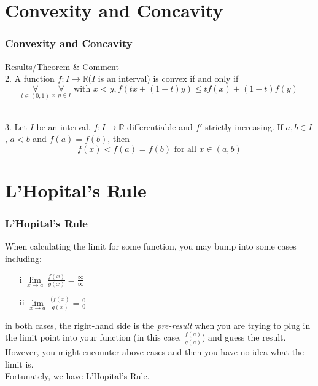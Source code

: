 \documentclass[12pt, t]{beamer}
\renewcommand{\emph}[1]{{\color{Turquoise3}\textsl{#1}}}
\begin{document}
\section{Convexity and Concavity}
\begin{frame}
    \frametitle{Convexity and Concavity}
Results/Theorem \& Comment\\
\vspace{1em}
2. A function $f:I\rightarrow\mathbb{R}$($I$ is an interval) is convex if and only if 
\begin{equation*}
    \underset{t\in(0,1)}{\forall}\ \underset{x,y\in I}{\forall}\text{ with } x<y, f(tx+(1-t)y)\leq tf(x)+(1-t)f(y)
\end{equation*}\\

\vspace{2em}

3. Let $I$ be an interval, $f:I\rightarrow\mathbb{R}$ differentiable and $f'$ strictly increasing. If $a, b\in I$, $a<b$ and 
$f(a)=f(b)$, then 
\begin{equation*}
    f(x)<f(a)=f(b)\text{ for all }x\in(a,b)
\end{equation*}

\end{frame}

\section{L'Hopital's Rule}
\begin{frame}
    \frametitle{L'Hopital's Rule}
When calculating the limit for some function, you may bump into some cases including:
\begin{center}
    \begin{enumerate}
        \center \item[i] $\underset{x\rightarrow a}{\lim}\ \frac{f(x)}{g(x)} =\frac{\infty}{\infty}$
        \center \item[ii]$\underset{x\rightarrow a}{\lim}\ \frac{(f(x)}{g(x)} = \frac{0}{0}$ 
    \end{enumerate}
\end{center}

\hspace{1em}
in both cases, the right-hand side is the \emph{pre-result} when you are trying to plug in the limit point into your function 
(in this case, $\frac{f(a)}{g(a)}$) 
and guess the result. \\

\hspace{1em}
However, you might encounter above cases and then you have no idea what the limit is. \\
\hspace{1em}
Fortunately, we have L'Hopital's Rule.


\end{frame}
\end{document}

